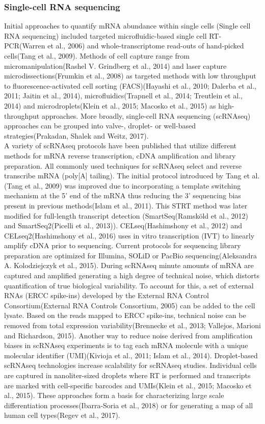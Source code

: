 \subsubsection{Single-cell RNA sequencing}
Initial approaches to quantify mRNA abundance within single cells (Single cell RNA sequencing) included targeted microfluidic-based single cell RT-PCR(Warren et al., 2006) and whole-transcriptome read-outs of hand-picked cells(Tang et al., 2009). Methods of cell capture range from micromanipulation(Rashel V. Grindberg et al., 2014) and laser capture microdissections(Frumkin et al., 2008) as targeted methods with low throughput to  fluorescence-activated cell sorting (FACS)(Hayashi et al., 2010; Dalerba et al., 2011; Jaitin et al., 2014), microfluidics(Trapnell et al., 2014; Treutlein et al., 2014) and microdroplets(Klein et al., 2015; Macosko et al., 2015) as high-throughput approaches. More broadly, single-cell RNA sequencing (scRNAseq) approaches can be grouped into valve-, droplet- or well-based strategies(Prakadan, Shalek and Weitz, 2017).\\
A variety of scRNAseq protocols have been published that utilize different methods for mRNA reverse transcription, cDNA amplification and library preparation. All commonly used techniques for scRNAseq select and reverse transcribe mRNA (poly[A] tailing). The initial protocol introduced by Tang et al.(Tang et al., 2009) was improved due to incorporating a template switching mechanism at the 5' end of the mRNA thus reducing the 3' sequencing bias present in previous methods(Islam et al., 2011). This STRT method was later modified for full-length transcript detection (SmartSeq(Ramsköld et al., 2012) and SmartSeq2(Picelli et al., 2013)). CELseq(Hashimshony et al., 2012) and CELseq2(Hashimshony et al., 2016) uses in vitro transcription (IVT) to linearly amplify cDNA prior to sequencing. Current protocols for sequencing library preparation are optimized for Illumina, SOLiD or PacBio sequencing(Aleksandra A. Kolodziejczyk et al., 2015). 
During scRNAseq minute amounts of mRNA are captured and amplified generating a high degree of technical noise, which distorts quantification of true biological variability. To account for this, a set of external RNAs (ERCC spike-ins) developed by the External RNA Control Consortium(External RNA Controls Consortium, 2005) can be added to the cell lysate. Based on the reads mapped to ERCC spike-ins, technical noise can be removed from total expression variability(Brennecke et al., 2013; Vallejos, Marioni and Richardson, 2015). Another way to reduce noise derived from amplification biases in scRNAseq experiments is to tag each mRNA molecule with a unique molecular identifier (UMI)(Kivioja et al., 2011; Islam et al., 2014). 
Droplet-based scRNAseq technologies increase scalability for scRNAseq studies. Individual cells are captured in nanoliter-sized droplets where RT is performed and transcripts are marked with cell-specific barcodes and UMIs(Klein et al., 2015; Macosko et al., 2015). These approaches form a basis for characterizing large scale differentiation processes(Ibarra-Soria et al., 2018) or for generating a map of all human cell types(Regev et al., 2017).

